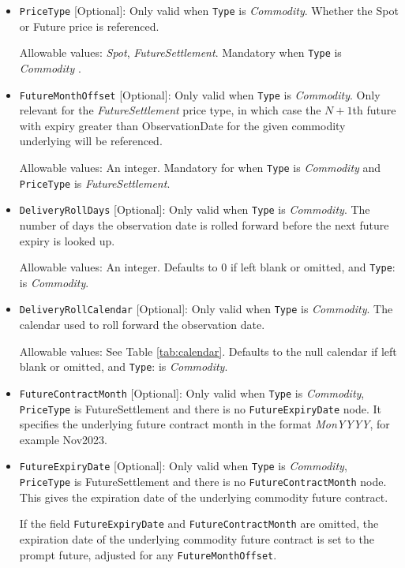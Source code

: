 \begin{itemize}
\item \lstinline!PriceType! [Optional]:
Only valid when  \lstinline!Type! is  \emph{Commodity}.  Whether the Spot or Future price is referenced. 

Allowable values:  \emph{Spot}, \emph{FutureSettlement}. Mandatory when  \lstinline!Type! is  \emph{Commodity} .

\item \lstinline!FutureMonthOffset! [Optional]:
Only valid when  \lstinline!Type! is  \emph{Commodity}. Only relevant for the \emph{FutureSettlement} price type, in which case the $N+1$th future with
  expiry greater than ObservationDate for the given commodity underlying will be referenced.

Allowable values:  An integer. Mandatory for when  \lstinline!Type! is  \emph{Commodity} and \lstinline!PriceType! is \emph{FutureSettlement}.

\item \lstinline!DeliveryRollDays! [Optional]:
Only valid when  \lstinline!Type! is  \emph{Commodity}.  The number of days the observation date is rolled forward before the
  next future expiry is looked up.
  
Allowable values: An integer. Defaults to 0 if left blank or omitted, and \lstinline!Type!: is  \emph{Commodity}.

\item \lstinline!DeliveryRollCalendar! [Optional]:
Only valid when  \lstinline!Type! is  \emph{Commodity}.  The calendar used to roll forward the observation date.

Allowable values: See Table \ref{tab:calendar}. Defaults to the null calendar if left blank or omitted, and \lstinline!Type!: is  \emph{Commodity}.

\item \lstinline!FutureContractMonth! [Optional]:
Only valid when  \lstinline!Type! is  \emph{Commodity}, \lstinline!PriceType! is FutureSettlement and there is no \lstinline!FutureExpiryDate! node. It specifies the underlying future contract month  in the format \emph{MonYYYY}, for example Nov2023. 

\item \lstinline!FutureExpiryDate! [Optional]:
Only valid when  \lstinline!Type! is  \emph{Commodity}, \lstinline!PriceType! is FutureSettlement and there is no \lstinline!FutureContractMonth! node. This gives the expiration date of the underlying commodity future contract. 

If the field \lstinline!FutureExpiryDate! and \lstinline!FutureContractMonth! are omitted, the expiration date of the underlying commodity future contract is set to the prompt future, adjusted for any \lstinline!FutureMonthOffset!.


\end{itemize}
